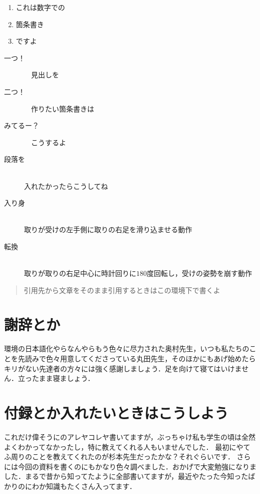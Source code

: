 \documentclass[platex,dvipdfmx]{jlreq}%
\numberwithin{equation}{section}%
\begin{document}
\begin{enumerate}
 \item これは数字での
 \item 箇条書き
 \item ですよ
\end{enumerate}

\begin{description}
 \item[一つ！]　見出しを 
 \item[二つ！]　作りたい箇条書きは
 \item[みてるー？]　こうするよ 
 \item[段落を]\mbox{}\\
	    入れたかったらこうしてね
 \item[入り身]\mbox{}\\
	    取りが受けの左手側に取りの右足を滑り込ませる動作
 \item[転換]\mbox{}\\
	    取りが取りの右足中心に時計回りに$180$度回転し，受けの姿勢を崩す動作
\end{description}



\begin{quotation}
 引用先から文章をそのまま引用するときはこの環境下で書くよ
\end{quotation}

  
\section*{謝辞とか}

\LaTeXe 環境の日本語化やらなんやらもう色々に尽力された奥村先生\cite{okumura7th}，いつも私たちのことを先読みで色々用意してくださっている丸田先生，そのほかにもあげ始めたらキリがない先達者の方々には強く感謝しましょう．足を向けて寝てはいけません．立ったまま寝ましょう．

\appendix
\section{付録とか入れたいときはこうしよう}

これだけ偉そうに\LaTeXe のアレヤコレヤ書いてますが，ぶっちゃけ私も学生の頃は全然よくわかってなかったし，特に教えてくれる人もいませんでした．
最初にやてふ周りのことを教えてくれたのが杉本先生だったかな？それぐらいです．
さらには今回の資料を書くのにもかなり色々調べました．おかげで大変勉強になりました．まるで昔から知ってたように全部書いてますが，最近やたった今知ったばかりのにわか知識もたくさん入ってます．
\end{document}
